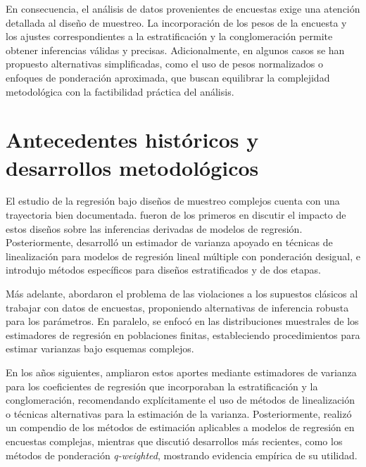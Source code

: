 \documentclass[
  spanish,
  12pt,
]{book}
\begin{document}
En consecuencia, el análisis de datos provenientes de encuestas exige una atención detallada al diseño de muestreo. La incorporación de los pesos de la encuesta y los ajustes correspondientes a la estratificación y la conglomeración permite obtener inferencias válidas y precisas. Adicionalmente, en algunos casos se han propuesto alternativas simplificadas, como el uso de pesos normalizados o enfoques de ponderación aproximada, que buscan equilibrar la complejidad metodológica con la factibilidad práctica del análisis.

\section{Antecedentes históricos y desarrollos metodológicos}\label{antecedentes-histuxf3ricos-y-desarrollos-metodoluxf3gicos}

El estudio de la regresión bajo diseños de muestreo complejos cuenta con una trayectoria bien documentada. \citet{kish1974inference} fueron de los primeros en discutir el impacto de estos diseños sobre las inferencias derivadas de modelos de regresión. Posteriormente, \citet{fuller1975regression} desarrolló un estimador de varianza apoyado en técnicas de linealización para modelos de regresión lineal múltiple con ponderación desigual, e introdujo métodos específicos para diseños estratificados y de dos etapas.

Más adelante, \citet{shah1977inference} abordaron el problema de las violaciones a los supuestos clásicos al trabajar con datos de encuestas, proponiendo alternativas de inferencia robusta para los parámetros. En paralelo, \citet{binder1983variances} se enfocó en las distribuciones muestrales de los estimadores de regresión en poblaciones finitas, estableciendo procedimientos para estimar varianzas bajo esquemas complejos.

En los años siguientes, \citet{skinner1989analysis} ampliaron estos aportes mediante estimadores de varianza para los coeficientes de regresión que incorporaban la estratificación y la conglomeración, recomendando explícitamente el uso de métodos de linealización o técnicas alternativas para la estimación de la varianza. Posteriormente, \citet{fuller2002regression} realizó un compendio de los métodos de estimación aplicables a modelos de regresión en encuestas complejas, mientras que \citet{pfeffermann2011modelling} discutió desarrollos más recientes, como los métodos de ponderación \emph{q-weighted}, mostrando evidencia empírica de su utilidad.
\end{document}
